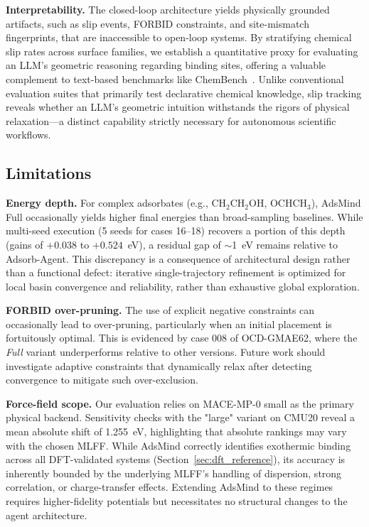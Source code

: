 \textbf{Interpretability.} The closed-loop architecture yields physically grounded artifacts, such as slip events, FORBID constraints, and site-mismatch fingerprints, that are inaccessible to open-loop systems. By stratifying chemical slip rates across surface families, we establish a quantitative proxy for evaluating an LLM's geometric reasoning regarding binding sites, offering a valuable complement to text-based benchmarks like ChemBench~\cite{mirza2024chembench}. Unlike conventional evaluation suites that primarily test declarative chemical knowledge, slip tracking reveals whether an LLM's geometric intuition withstands the rigors of physical relaxation---a distinct capability strictly necessary for autonomous scientific workflows.

\subsection{Limitations}

\textbf{Energy depth.} For complex adsorbates (e.g., CH$_2$CH$_2$OH, OCHCH$_3$), AdsMind Full occasionally yields higher final energies than broad-sampling baselines. While multi-seed execution (5 seeds for cases 16--18) recovers a portion of this depth (gains of $+0.038$ to $+0.524$~eV), a residual gap of $\sim$1~eV remains relative to Adsorb-Agent. This discrepancy is a consequence of architectural design rather than a functional defect: iterative single-trajectory refinement is optimized for local basin convergence and reliability, rather than exhaustive global exploration.

\textbf{FORBID over-pruning.} The use of explicit negative constraints can occasionally lead to over-pruning, particularly when an initial placement is fortuitously optimal. This is evidenced by case 008 of OCD-GMAE62, where the \textit{Full} variant underperforms relative to other versions. Future work should investigate adaptive constraints that dynamically relax after detecting convergence to mitigate such over-exclusion.

\textbf{Force-field scope.} Our evaluation relies on MACE-MP-0 small as the primary physical backend. Sensitivity checks with the "large" variant on CMU20 reveal a mean absolute shift of 1.255~eV, highlighting that absolute rankings may vary with the chosen MLFF. While AdsMind correctly identifies exothermic binding across all DFT-validated systems (Section~\ref{sec:dft_reference}), its accuracy is inherently bounded by the underlying MLFF's handling of dispersion, strong correlation, or charge-transfer effects. Extending AdsMind to these regimes requires higher-fidelity potentials but necessitates no structural changes to the agent architecture.

